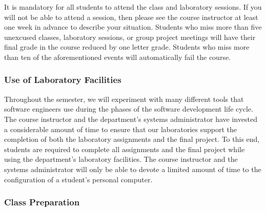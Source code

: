   It is mandatory for all students to attend the class and laboratory sessions. If you will not be able to attend a
  session, then please see the course instructor at least one week in advance to describe your situation.  Students who
  miss more than five unexcused classes, laboratory sessions, or group project meetings will have their final grade in the
  course reduced by one letter grade. Students who miss more than ten of the aforementioned events will automatically fail
  the course.


  \subsubsection*{Use of Laboratory Facilities}

  Throughout the semester, we will experiment with many different tools that software engineers use during the phases of
  the software development life cycle.  The course instructor and the department's systems administrator have invested a
  considerable amount of time to ensure that our laboratories support the completion of both the laboratory assignments and the
  final project.  To this end, students are required to complete all assignments and the final project while using the
  department's laboratory facilities. The course instructor and the systems administrator will only be able to devote a
  limited amount of time to the configuration of a student's personal computer.

  \subsubsection*{Class Preparation}

